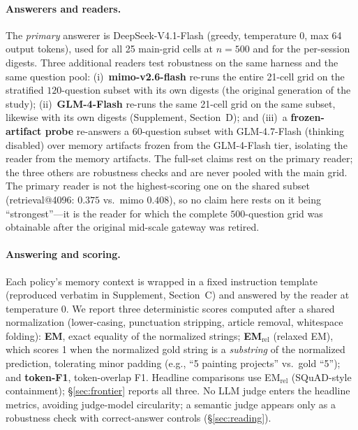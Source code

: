 \documentclass{article} %
\begin{document}
\paragraph{Answerers and readers.} The \emph{primary} answerer is DeepSeek-V4.1-Flash
(greedy, temperature $0$, max 64 output tokens), used for all 25 main-grid cells at
$n{=}500$ and for the per-session digests. Three additional readers test robustness on the
same harness and the same question pool: (i)~\textbf{mimo-v2.6-flash} re-runs the entire
21-cell grid on the stratified $120$-question subset with its own digests (the original
generation of the study); (ii)~\textbf{GLM-4-Flash} re-runs the same 21-cell grid on the
same subset, likewise with its own digests (Supplement, Section~D); and
(iii)~a \textbf{frozen-artifact probe} re-answers a $60$-question subset with
GLM-4.7-Flash (thinking disabled) over memory artifacts frozen from the GLM-4-Flash tier,
isolating the reader from the memory artifacts. The full-set claims rest on the primary
reader; the three others are robustness checks and are never pooled with the main grid.
The primary reader is not the highest-scoring one on the shared subset (retrieval@4096:
$0.375$ vs.\ mimo $0.408$), so no claim here rests on it being ``strongest''---it is the
reader for which the complete $500$-question grid was obtainable after the original
mid-scale gateway was retired.

\paragraph{Answering and scoring.} Each policy's memory context is wrapped in a fixed
instruction template (reproduced verbatim in Supplement, Section~C) and answered by
the reader at temperature $0$. We report three deterministic scores computed after a
shared normalization (lower-casing, punctuation stripping, article removal, whitespace
folding): \textbf{EM}, exact equality of the normalized strings; \textbf{EM$_{\text{rel}}$}
(relaxed EM), which scores 1 when the normalized gold string is a \emph{substring} of the
normalized prediction, tolerating minor padding (e.g., ``5 painting projects'' vs.\ gold
``5''); and \textbf{token-F1}, token-overlap F1. Headline comparisons use
EM$_{\text{rel}}$ (SQuAD-style containment); \S\ref{sec:frontier} reports all three. No
LLM judge enters the headline metrics, avoiding judge-model circularity; a semantic judge
appears only as a robustness check with correct-answer controls (\S\ref{sec:reading}).
\end{document}
